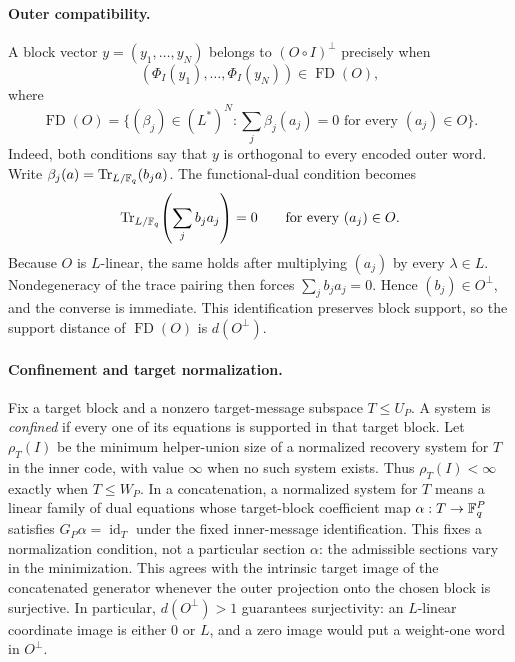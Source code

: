 \paragraph{Outer compatibility.}
A block vector
$y=(y_1,\ldots,y_N)$ belongs to $(O\circ I)^\perp$ precisely when
\begin{equation}
 (\Phi_I(y_1),\ldots,\Phi_I(y_N))\in
 \operatorname{FD}(O),
 \label{eq:block-functional-dual}
\end{equation}
where
\[
 \operatorname{FD}(O)=
 \{(\beta_j)\in(L^*)^N:\textstyle\sum_j\beta_j(a_j)=0
       \text{ for every }(a_j)\in O\}.
\]
Indeed, both conditions say that $y$ is orthogonal to every encoded outer
word.  Write $\beta_j(a)=\operatorname{Tr}_{L/\mathbb F_q}(b_ja)$.  The functional-dual
condition becomes
\[
 \operatorname{Tr}_{L/\mathbb F_q}\!\left(\sum_j b_ja_j\right)=0
 \qquad\text{for every }(a_j)\in O.
\]
Because $O$ is $L$-linear, the same holds after multiplying $(a_j)$ by every
$\lambda\in L$.  Nondegeneracy of the trace pairing then forces
$\sum_jb_ja_j=0$.  Hence $(b_j)\in O^\perp$, and the converse is immediate.
This identification preserves block support, so the support distance of
$\operatorname{FD}(O)$ is $d(O^\perp)$.

\paragraph{Confinement and target normalization.}
Fix a target block and a nonzero target-message subspace $T\leq U_P$.  A
system is \emph{confined} if every one of its equations is supported in that
target block.  Let
$\rho_T(I)$ be the minimum helper-union size of a normalized recovery system
for $T$ in the inner code, with value $\infty$ when no such system exists.
Thus $\rho_T(I)<\infty$ exactly when $T\leq W_P$.  In a concatenation, a
normalized system for $T$ means a linear family of dual equations whose
target-block coefficient map $\alpha:T\to\mathbb F_q^P$ satisfies
$G_P\alpha=\operatorname{id}_T$ under the fixed inner-message
identification.  This fixes a normalization condition, not a particular
section $\alpha$: the admissible sections vary in the minimization.
This agrees with the intrinsic target image of the
concatenated generator whenever the outer projection onto the chosen block is
surjective.  In particular, $d(O^\perp)>1$ guarantees surjectivity: an
$L$-linear coordinate image is either $0$ or $L$, and a zero image would put a
weight-one word in $O^\perp$.

